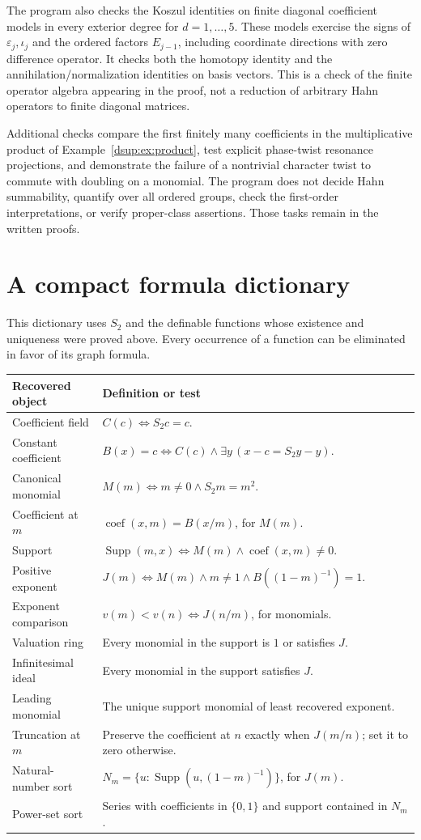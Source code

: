 \documentclass[11pt,oneside]{article}
\numberwithin{equation}{section}
\theoremstyle{definition}
\theoremstyle{remark}
\newcommand{\coef}{\operatorname{coef}}
\newcommand{\eps}{\varepsilon}
\DeclareMathOperator{\Supp}{Supp}
\begin{document}
The program also checks the Koszul identities on finite diagonal
coefficient models in every exterior degree for $d=1,\ldots,5$. These
models exercise the signs of $\eps_j,\iota_j$ and the ordered factors
$E_{j-1}$, including coordinate directions with zero difference operator.
It checks both the homotopy identity and the annihilation/normalization
identities on basis vectors. This is a check of the finite operator
algebra appearing in the proof, not a reduction of arbitrary Hahn
operators to finite diagonal matrices.

Additional checks compare the first finitely many coefficients in the
multiplicative product of Example~\ref{dsup:ex:product},
test explicit phase-twist resonance projections, and demonstrate the
failure of a nontrivial character twist to commute with doubling on a
monomial. The program does not decide Hahn summability, quantify over
all ordered groups, check the first-order interpretations, or verify
proper-class assertions. Those tasks remain in the written proofs.

\section{A compact formula dictionary}\label{dsup:app:formulas}

This dictionary uses $S_2$ and the definable functions whose existence
and uniqueness were proved above. Every occurrence of a function can
be eliminated in favor of its graph formula.

\renewcommand{\arraystretch}{1.25}
\begin{longtable}{@{}p{}p{}@{}}
\toprule
Recovered object & Definition or test \\
\midrule\endhead
Coefficient field & $C(c)\iff S_2c=c$.\\
Constant coefficient & $B(x)=c\iff C(c)\land\exists y\,(x-c=S_2y-y)$.\\
Canonical monomial & $M(m)\iff m\ne0\land S_2m=m^2$.\\
Coefficient at $m$ & $\coef(x,m)=B(x/m)$, for $M(m)$.\\
Support & $\Supp(m,x)\iff M(m)\land\coef(x,m)\ne0$.\\
Positive exponent & $J(m)\iff M(m)\land m\ne1\land B((1-m)^{-1})=1$.\\
Exponent comparison & $v(m)<v(n)\iff J(n/m)$, for monomials.\\
Valuation ring & Every monomial in the support is $1$ or satisfies $J$.\\
Infinitesimal ideal & Every monomial in the support satisfies $J$.\\
Leading monomial & The unique support monomial of least recovered exponent.\\
Truncation at $m$ & Preserve the coefficient at $n$ exactly when $J(m/n)$; set it to zero otherwise.\\
Natural-number sort & $N_m=\{u:\Supp(u,(1-m)^{-1})\}$, for $J(m)$.\\
Power-set sort & Series with coefficients in $\{0,1\}$ and support contained in $N_m$.\\
\bottomrule
\end{longtable}
\end{document}
